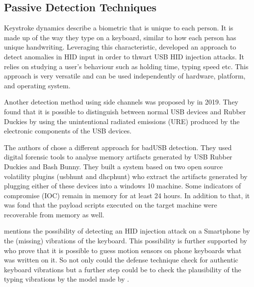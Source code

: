 \subsection{Passive Detection Techniques}


Keystroke dynamics describe a biometric that is unique to each person. It is made up of the way they type on a keyboard, similar to how each person has unique handwriting. Leveraging this characteristic, \cite{barbhuiyaAnomalyBasedApproach2012} developed an approach to detect anomalies in HID input in order to thwart USB HID injection attacks. It relies on studying a user's behaviour such as holding time, typing speed etc. This approach is very versatile and can be used independently of hardware, platform, and operating system.  

Another detection method using side channels was proposed by \cite{ibrahimRFDNAFingerprintingDetection2019} in 2019. They found that it is possible to distinguish between normal USB devices and Rubber Duckies by using the unintentional radiated emissions (URE) produced by the electronic components of the USB devices. 

The authors of \cite{thomasDuckHuntMemory2021} chose a different approach for badUSB detection. They used digital forensic tools to analyse memory artifacts generated by USB Rubber Duckies and Bash Bunny. They built a system based on two open source volatility plugins (usbhunt and dhcphunt) who extract the artifacts generated by plugging either of these devices into a windows 10 machine. Some indicators of compromise (IOC) remain in memory for at least 24 hours. In addition to that, it was fond that the payload scripts executed on the target machine were recoverable from memory as well. 

\cite{bojovicRisingThreatHardware2019} mentions the possibility of detecting an HID injection attack on a Smartphone by the (missing) vibrations of the keyboard. This possibility is further supported by \cite{zhuangKeyboardAcousticEmanations2009} who prove that it is possible to guess motion sensors on phone keyboards what was written on it. So not only could the defense technique check for authentic keyboard vibrations but a further step could be to check the plausibility of the typing vibrations by the model made by \cite{zhuangKeyboardAcousticEmanations2009}. 

